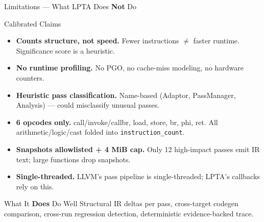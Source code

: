 \documentclass[aspectratio=169]{beamer}
\begin{document}
\begin{frame}{Limitations — What LPTA Does \textbf{Not} Do}
  \begin{alertblock}{Calibrated Claims}
    \begin{itemize}
      \item \textbf{Counts structure, not speed.} Fewer instructions $\neq$ faster runtime. Significance score is a heuristic.
      \item \textbf{No runtime profiling.} No PGO, no cache-miss modeling, no hardware counters.
      \item \textbf{Heuristic pass classification.} Name-based (Adaptor, PassManager, Analysis) — could misclassify unusual passes.
      \item \textbf{6 opcodes only.} call/invoke/callbr, load, store, br, phi, ret. All arithmetic/logic/cast folded into \texttt{instruction\_count}.
      \item \textbf{Snapshots allowlisted + 4 MiB cap.} Only 12 high-impact passes emit IR text; large functions drop snapshots.
      \item \textbf{Single-threaded.} LLVM's pass pipeline is single-threaded; LPTA's callbacks rely on this.
    \end{itemize}
  \end{alertblock}
  \vspace{0.5em}
  \begin{block}{What It \textbf{Does} Do Well}
    Structural IR deltas per pass, cross-target codegen comparison, cross-run regression detection, deterministic evidence-backed trace.
  \end{block}
\end{frame}
\end{document}
